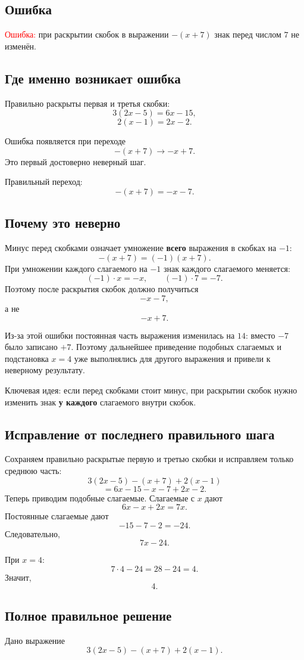 \documentclass[12pt,a4paper]{article}
\begin{document}
\subsection*{Ошибка}
\textcolor{red}{Ошибка:} при раскрытии скобок в выражении $-(x+7)$ знак перед числом $7$ не изменён.

\subsection*{Где именно возникает ошибка}
Правильно раскрыты первая и третья скобки:
\[
3(2x-5)=6x-15,
\]
\[
2(x-1)=2x-2.
\]

Ошибка появляется при переходе
\[
-(x+7)\longrightarrow -x+7.
\]
Это первый достоверно неверный шаг.

Правильный переход:
\[
-(x+7)=-x-7.
\]

\subsection*{Почему это неверно}
Минус перед скобками означает умножение \textbf{всего} выражения в скобках на $-1$:
\[
-(x+7)=(-1)(x+7).
\]
При умножении каждого слагаемого на $-1$ знак каждого слагаемого меняется:
\[
(-1)\cdot x=-x,
\qquad
(-1)\cdot7=-7.
\]
Поэтому после раскрытия скобок должно получиться
\[
-x-7,
\]
а не
\[
-x+7.
\]

Из-за этой ошибки постоянная часть выражения изменилась на $14$: вместо $-7$ было записано $+7$. Поэтому дальнейшее приведение подобных слагаемых и подстановка $x=4$ уже выполнялись для другого выражения и привели к неверному результату.

\textcolor{blue!60!black}{Ключевая идея:} если перед скобками стоит минус, при раскрытии скобок нужно изменить знак \textbf{у каждого} слагаемого внутри скобок.

\subsection*{Исправление от последнего правильного шага}
Сохраняем правильно раскрытые первую и третью скобки и исправляем только среднюю часть:
\[
3(2x-5)-(x+7)+2(x-1)
\]
\[
=6x-15-x-7+2x-2.
\]
Теперь приводим подобные слагаемые. Слагаемые с $x$ дают
\[
6x-x+2x=7x.
\]
Постоянные слагаемые дают
\[
-15-7-2=-24.
\]
Следовательно,
\[
\boxed{7x-24}.
\]

При $x=4$:
\[
7\cdot4-24=28-24=4.
\]
Значит,
\[
\boxed{4}.
\]

\subsection*{Полное правильное решение}
Дано выражение
\[
3(2x-5)-(x+7)+2(x-1).
\]
\end{document}
